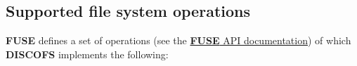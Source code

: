\documentclass[a4paper]{article}
\newcommand{\software}[1]{\textsc{\textbf{#1}}\xspace}
\newcommand{\discofs}{\software{DISCOFS}}
\newcommand{\fuse}{\software{FUSE}}
\begin{document}
\begin{appendix} %
\section{Supported file system operations} %
\label{sec:fsops}
\fuse defines a set of operations (see the
\href{http://fuse.sourceforge.net/doxygen/structfuse__operations.html}{\fuse
API documentation}) of which \discofs implements the following:

\newcommand{\fsop}[3]{ %
\item \label{fsop:#1} \texttt{#1}
	\ifthenelse{\equal{#2}{-}}
		{(No corresponding \textsc{POSIX} function)}
		{(\textsc{POSIX}: \texttt{\ifthenelse{\equal{#2}{}}{#1}{#2}})}
		\\
	#3 \\
}
\begin{itemize}\itemsep0pt

\end{itemize}

\end{appendix}%
\end{document}
